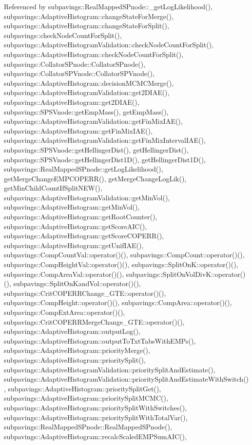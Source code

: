 \-Referenced by subpavings\-::\-Real\-Mapped\-S\-Pnode\-::\-\_\-get\-Log\-Likelihood(), subpavings\-::\-Adaptive\-Histogram\-::change\-State\-For\-Merge(), subpavings\-::\-Adaptive\-Histogram\-::change\-State\-For\-Split(), subpavings\-::check\-Node\-Count\-For\-Split(), subpavings\-::\-Adaptive\-Histogram\-Validation\-::check\-Node\-Count\-For\-Split(), subpavings\-::\-Adaptive\-Histogram\-::check\-Node\-Count\-For\-Split(), subpavings\-::\-Collator\-S\-Pnode\-::\-Collator\-S\-Pnode(), subpavings\-::\-Collator\-S\-P\-Vnode\-::\-Collator\-S\-P\-Vnode(), subpavings\-::\-Adaptive\-Histogram\-::decision\-M\-C\-M\-C\-Merge(), subpavings\-::\-Adaptive\-Histogram\-Validation\-::get2\-D\-I\-A\-E(), subpavings\-::\-Adaptive\-Histogram\-::get2\-D\-I\-A\-E(), subpavings\-::\-S\-P\-S\-Vnode\-::get\-Emp\-Mass(), get\-Emp\-Mass(), subpavings\-::\-Adaptive\-Histogram\-Validation\-::get\-Fin\-Mix\-I\-A\-E(), subpavings\-::\-Adaptive\-Histogram\-::get\-Fin\-Mix\-I\-A\-E(), subpavings\-::\-Adaptive\-Histogram\-Validation\-::get\-Fin\-Mix\-Interval\-I\-A\-E(), subpavings\-::\-S\-P\-S\-Vnode\-::get\-Hellinger\-Dist(), get\-Hellinger\-Dist(), subpavings\-::\-S\-P\-S\-Vnode\-::get\-Hellinger\-Dist1\-D(), get\-Hellinger\-Dist1\-D(), subpavings\-::\-Real\-Mapped\-S\-Pnode\-::get\-Log\-Likelihood(), get\-Merge\-Change\-E\-M\-P\-C\-O\-P\-E\-R\-R(), get\-Merge\-Change\-Log\-Lik(), get\-Min\-Child\-Count\-If\-Split\-N\-E\-W(), subpavings\-::\-Adaptive\-Histogram\-Validation\-::get\-Min\-Vol(), subpavings\-::\-Adaptive\-Histogram\-::get\-Min\-Vol(), subpavings\-::\-Adaptive\-Histogram\-::get\-Root\-Counter(), subpavings\-::\-Adaptive\-Histogram\-::get\-Score\-A\-I\-C(), subpavings\-::\-Adaptive\-Histogram\-::get\-Score\-C\-O\-P\-E\-R\-R(), subpavings\-::\-Adaptive\-Histogram\-::get\-Unif\-I\-A\-E(), subpavings\-::\-Comp\-Count\-Val\-::operator()(), subpavings\-::\-Comp\-Count\-::operator()(), subpavings\-::\-Comp\-Height\-Val\-::operator()(), subpavings\-::\-Split\-On\-K\-::operator()(), subpavings\-::\-Comp\-Area\-Val\-::operator()(), subpavings\-::\-Split\-On\-Vol\-Div\-K\-::operator()(), subpavings\-::\-Split\-On\-Kand\-Vol\-::operator()(), subpavings\-::\-Crit\-C\-O\-P\-E\-R\-R\-Change\-\_\-\-G\-T\-E\-::operator()(), subpavings\-::\-Comp\-Height\-::operator()(), subpavings\-::\-Comp\-Area\-::operator()(), subpavings\-::\-Comp\-Ext\-Area\-::operator()(), subpavings\-::\-Crit\-C\-O\-P\-E\-R\-R\-Merge\-Change\-\_\-\-G\-T\-E\-::operator()(), subpavings\-::\-Adaptive\-Histogram\-::output\-Log(), subpavings\-::\-Adaptive\-Histogram\-::output\-To\-Txt\-Tabs\-With\-E\-M\-Ps(), subpavings\-::\-Adaptive\-Histogram\-::priority\-Merge(), subpavings\-::\-Adaptive\-Histogram\-::priority\-Split(), subpavings\-::\-Adaptive\-Histogram\-Validation\-::priority\-Split\-And\-Estimate(), subpavings\-::\-Adaptive\-Histogram\-Validation\-::priority\-Split\-And\-Estimate\-With\-Switch(), subpavings\-::\-Adaptive\-Histogram\-::priority\-Split\-Get(), subpavings\-::\-Adaptive\-Histogram\-::priority\-Split\-M\-C\-M\-C(), subpavings\-::\-Adaptive\-Histogram\-::priority\-Split\-With\-Switches(), subpavings\-::\-Adaptive\-Histogram\-::priority\-Split\-With\-Total\-Var(), subpavings\-::\-Real\-Mapped\-S\-Pnode\-::\-Real\-Mapped\-S\-Pnode(), subpavings\-::\-Adaptive\-Histogram\-::recalc\-Scaled\-E\-M\-P\-Sum\-A\-I\-C(), 